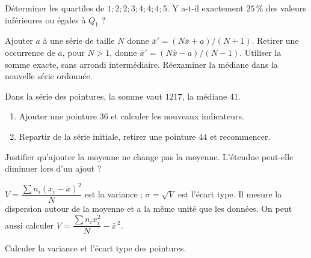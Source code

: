 \begin{example}Déterminer les quartiles de $1;2;2;3;4;4;4;5$. Y a-t-il exactement $25\,\%$ des valeurs inférieures ou égales à $Q_1$ ?\end{example}
\begin{keypoint}[Propriétés]
Ajouter $a$ à une série de taille $N$ donne $\overline x'=(N\overline x+a)/(N+1)$.
Retirer une occurrence de $a$, pour $N>1$, donne $\overline x'=(N\overline x-a)/(N-1)$. Utiliser la somme exacte, sans arrondi intermédiaire. Réexaminer la médiane dans la nouvelle série ordonnée.
\end{keypoint}
\begin{example}Dans la série des pointures, la somme vaut $1217$, la médiane $41$.
\begin{enumerate}\item Ajouter une pointure $36$ et calculer les nouveaux indicateurs.\item Repartir de la série initiale, retirer une pointure $44$ et recommencer.\end{enumerate}\end{example}
\begin{example}Justifier qu'ajouter la moyenne ne change pas la moyenne. L'étendue peut-elle diminuer lors d'un ajout ?\end{example}
\begin{keypoint}[Définitions]
$V=\dfrac{\sum n_i(x_i-\overline x)^2}{N}$ est la variance ; $\sigma=\sqrt V$ est l'écart type. Il mesure la dispersion autour de la moyenne et a la même unité que les données. On peut aussi calculer $V=\dfrac{\sum n_ix_i^2}{N}-\overline x^{\,2}$.
\end{keypoint}
\begin{example}Calculer la variance et l'écart type des pointures.\end{example}

